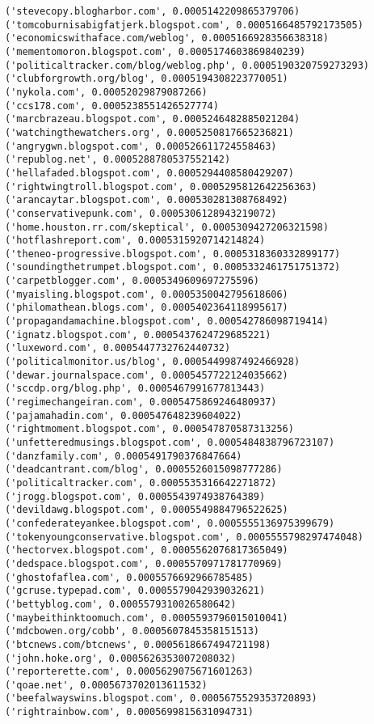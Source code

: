 \documentclass[11pt]{article}
\begin{document}
\begin{Verbatim}[commandchars=\\\{\}]
('stevecopy.blogharbor.com', 0.0005142209865379706)
('tomcoburnisabigfatjerk.blogspot.com', 0.0005166485792173505)
('economicswithaface.com/weblog', 0.0005166928356638318)
('mementomoron.blogspot.com', 0.0005174603869840239)
('politicaltracker.com/blog/weblog.php', 0.0005190320759273293)
('clubforgrowth.org/blog', 0.0005194308223770051)
('nykola.com', 0.00052029879087266)
('ccs178.com', 0.0005238551426527774)
('marcbrazeau.blogspot.com', 0.0005246482885021204)
('watchingthewatchers.org', 0.0005250817665236821)
('angrygwn.blogspot.com', 0.000526611724558463)
('republog.net', 0.0005288780537552142)
('hellafaded.blogspot.com', 0.0005294408580429207)
('rightwingtroll.blogspot.com', 0.0005295812642256363)
('arancaytar.blogspot.com', 0.000530281308768492)
('conservativepunk.com', 0.0005306128943219072)
('home.houston.rr.com/skeptical', 0.0005309427206321598)
('hotflashreport.com', 0.0005315920714214824)
('theneo-progressive.blogspot.com', 0.0005318360332899177)
('soundingthetrumpet.blogspot.com', 0.0005332461751751372)
('carpetblogger.com', 0.0005349609697275596)
('myaisling.blogspot.com', 0.0005350042795618606)
('philomathean.blogs.com', 0.0005402364118995617)
('propagandamachine.blogspot.com', 0.000542786098719414)
('ignatz.blogspot.com', 0.0005437624729685221)
('luxeword.com', 0.0005447732762440732)
('politicalmonitor.us/blog', 0.0005449987492466928)
('dewar.journalspace.com', 0.0005457722124035662)
('sccdp.org/blog.php', 0.0005467991677813443)
('regimechangeiran.com', 0.0005475869246480937)
('pajamahadin.com', 0.000547648239604022)
('rightmoment.blogspot.com', 0.000547870587313256)
('unfetteredmusings.blogspot.com', 0.0005484838796723107)
('danzfamily.com', 0.0005491790376847664)
('deadcantrant.com/blog', 0.0005526015098777286)
('politicaltracker.com', 0.0005535316642271872)
('jrogg.blogspot.com', 0.0005543974938764389)
('devildawg.blogspot.com', 0.0005549884796522625)
('confederateyankee.blogspot.com', 0.0005555136975399679)
('tokenyoungconservative.blogspot.com', 0.0005555798297474048)
('hectorvex.blogspot.com', 0.0005562076817365049)
('dedspace.blogspot.com', 0.0005570971781770969)
('ghostofaflea.com', 0.0005576692966785485)
('gcruse.typepad.com', 0.0005579042939032621)
('bettyblog.com', 0.0005579310026580642)
('maybeithinktoomuch.com', 0.0005593796015010041)
('mdcbowen.org/cobb', 0.0005607845358151513)
('btcnews.com/btcnews', 0.0005618667494721198)
('john.hoke.org', 0.0005626353007208032)
('reporterette.com', 0.0005629075671601263)
('qoae.net', 0.0005673702013611532)
('beefalwayswins.blogspot.com', 0.0005675529353720893)
('rightrainbow.com', 0.0005699815631094731)

\end{Verbatim}
\end{document}
